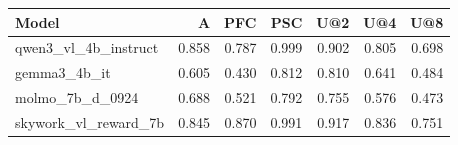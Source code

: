 \begin{tabular}{lrrrrrr}
\toprule
Model & A & PFC & PSC & U@2 & U@4 & U@8 \\
\midrule
qwen3\_vl\_4b\_instruct & 0.858 & 0.787 & 0.999 & 0.902 & 0.805 & 0.698 \\
gemma3\_4b\_it & 0.605 & 0.430 & 0.812 & 0.810 & 0.641 & 0.484 \\
molmo\_7b\_d\_0924 & 0.688 & 0.521 & 0.792 & 0.755 & 0.576 & 0.473 \\
skywork\_vl\_reward\_7b & 0.845 & 0.870 & 0.991 & 0.917 & 0.836 & 0.751 \\
\bottomrule
\end{tabular}
